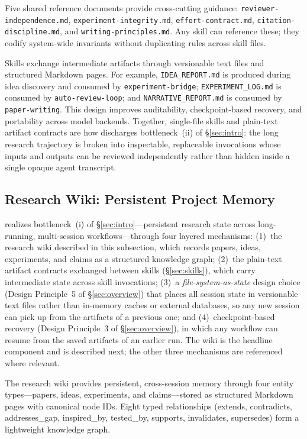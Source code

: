Five shared reference documents provide cross-cutting guidance: \texttt{reviewer-independence.md}, \texttt{experiment-integrity.md}, \texttt{effort-contract.md}, \texttt{citation-discipline.md}, and \texttt{writing-principles.md}.
Any skill can reference these; they codify system-wide invariants without duplicating rules across skill files.

Skills exchange intermediate artifacts through versionable text files and structured Markdown pages.
For example, \texttt{IDEA\_REPORT.md} is produced during idea discovery and consumed by \texttt{experiment-bridge}; \texttt{EXPERIMENT\_LOG.md} is consumed by \texttt{auto-review-loop}; and \texttt{NARRATIVE\_REPORT.md} is consumed by \texttt{paper-writing}.
This design improves auditability, checkpoint-based recovery, and portability across model backends.
Together, single-file skills and plain-text artifact contracts are how \aris{} discharges bottleneck~(ii) of \S\ref{sec:intro}: the long research trajectory is broken into inspectable, replaceable invocations whose inputs and outputs can be reviewed independently rather than hidden inside a single opaque agent transcript.

\subsection{Research Wiki: Persistent Project Memory}
\label{sec:wiki}

\aris{} realizes bottleneck~(i) of \S\ref{sec:intro}---persistent research state across long-running, multi-session workflows---through four layered mechanisms: (1)~the research wiki described in this subsection, which records papers, ideas, experiments, and claims as a structured knowledge graph; (2)~the plain-text artifact contracts exchanged between skills (\S\ref{sec:skills}), which carry intermediate state across skill invocations; (3)~a \emph{file-system-as-state} design choice (Design Principle~5 of \S\ref{sec:overview}) that places all session state in versionable text files rather than in-memory caches or external databases, so any new session can pick up from the artifacts of a previous one; and (4)~checkpoint-based recovery (Design Principle~3 of \S\ref{sec:overview}), in which any workflow can resume from the saved artifacts of an earlier run.
The wiki is the headline component and is described next; the other three mechanisms are referenced where relevant.

The research wiki provides persistent, cross-session memory through four entity types---papers, ideas, experiments, and claims---stored as structured Markdown pages with canonical node IDs.
Eight typed relationships (extends, contradicts, addresses\_gap, inspired\_by, tested\_by, supports, invalidates, supersedes) form a lightweight knowledge graph.


